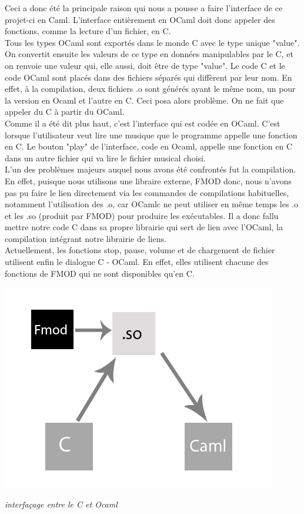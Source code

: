\documentclass[12pt,a4paper]{report}
\begin{document}
Ceci a donc été la principale raison qui nous a pousse a faire l'interface de ce projet-ci en Caml. L'interface entièrement en OCaml doit donc appeler des fonctions, comme la lecture d'un fichier, en C.\\

Tous les types OCaml sont exportés dans le monde C avec le type unique "value". On convertit ensuite les valeurs de ce type en données manipulables par le C, et on renvoie une valeur qui, elle aussi, doit être de type "value". Le code C et le code OCaml sont placés dans des fichiers séparés qui diffèrent par leur nom. En effet, à la compilation, deux fichiers .o sont générés ayant le même nom, un pour la version en Ocaml et l'autre en C. Ceci posa alors problème. On ne fait que appeler du C à partir du OCaml.\\

Comme il a été dit plus haut, c'est l'interface qui est codée en OCaml. C'est lorsque l'utilisateur veut lire une musique que le programme appelle une fonction en C. Le bouton "play" de l'interface, code en Ocaml, appelle une fonction en C dans un autre fichier qui va lire le fichier musical choisi.\\

L'un des problèmes majeurs auquel nous avons été confrontés fut la compilation. En effet, puisque nous utilisons une libraire externe, FMOD donc, nous n'avons pas pu faire le lien directement via les commandes de compilations habituelles, notamment l'utilisation des .o, car OCamlc ne peut utiliser en même temps les .o et les .so (produit par FMOD) pour produire les exécutables. Il a donc fallu mettre notre code C dans sa propre librairie qui sert de lien avec l'OCaml, la compilation intégrant notre librairie de liens.\\

Actuellement, les fonctions stop, pause, volume et de chargement de fichier utilisent enfin le dialogue C - OCaml. En effet, elles utilisent chacune des fonctions de FMOD qui ne sont disponibles qu'en C.

\begin{center}
\includegraphics[scale=0.7]{c_caml.jpg}

\it{interfaçage entre le C et Ocaml}
\end{center}
\end{document}
